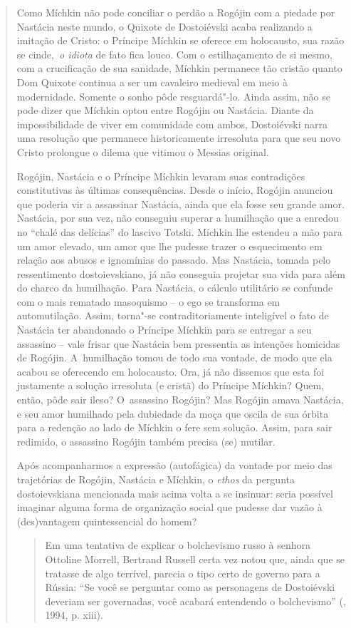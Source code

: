 {\begin{quote}
Como Míchkin não pode conciliar o perdão a Rogójin com a piedade por
Nastácia neste mundo, o Quixote de Dostoiévski acaba realizando a
imitação de Cristo: o Príncipe Míchkin se oferece em holocausto, sua
razão se cinde,~\emph{o idiota} de fato fica louco. Com o estilhaçamento
de si mesmo, com a crucificação de sua sanidade, Míchkin permanece tão
cristão quanto Dom Quixote continua a ser um cavaleiro medieval em meio
à modernidade. Somente o sonho pôde resguardá"-lo. Ainda assim, não se
pode dizer que Míchkin optou entre Rogójin ou Nastácia. Diante da
impossibilidade de viver em comunidade com ambos, Dostoiévski narra uma
resolução que permanece historicamente irresoluta para que seu novo
Cristo prolongue o dilema que vitimou o Messias original.

Rogójin, Nastácia e o Príncipe Míchkin levaram suas contradições
constitutivas às últimas consequências. Desde o início, Rogójin anunciou
que poderia vir a assassinar Nastácia, ainda que ela fosse seu grande
amor. Nastácia, por sua vez, não conseguiu superar a humilhação que a
enredou no ``chalé das delícias'' do lascivo Totski. Míchkin lhe
estendeu a mão para um amor elevado, um amor que lhe pudesse trazer o
esquecimento em relação aos abusos e ignomínias do passado. Mas
Nastácia, tomada pelo ressentimento dostoievskiano, já não conseguia
projetar sua vida para além do charco da humilhação. Para Nastácia, o
cálculo utilitário se confunde com o mais rematado masoquismo -- o ego
se transforma em automutilação. Assim, torna"-se contraditoriamente
inteligível o fato de Nastácia ter abandonado o Príncipe Míchkin para se
entregar a seu assassino -- vale frisar que Nastácia bem pressentia as
intenções homicidas de Rogójin. A~humilhação tomou de todo sua vontade,
de modo que ela acabou se oferecendo em holocausto. Ora, já não dissemos
que esta foi justamente a solução irresoluta (e cristã) do Príncipe
Míchkin? Quem, então, pôde sair ileso? O~assassino Rogójin? Mas Rogójin
amava Nastácia, e seu amor humilhado pela dubiedade da moça que oscila
de sua órbita para a redenção ao lado de Míchkin o fere sem solução.
Assim, para sair redimido, o assassino Rogójin também precisa (se)
mutilar.

Após acompanharmos a expressão (autofágica) da vontade por meio das
trajetórias de Rogójin, Nastácia e Míchkin, o \emph{ethos} da pergunta
dostoievskiana mencionada mais acima volta a se insinuar: seria possível
imaginar alguma forma de organização social que pudesse dar vazão à
(des)vantagem quintessencial do homem?

\begin{quote}
Em uma tentativa de explicar o bolchevismo russo à senhora Ottoline
Morrell, Bertrand Russell certa vez notou que, ainda que se tratasse de
algo terrível, parecia o tipo certo de governo para a Rússia: ``Se você
se perguntar como as personagens de Dostoiévski deveriam ser governadas,
você acabará entendendo o bolchevismo'' (, 1994, p. xiii).
\end{quote}


\end{quote}}
